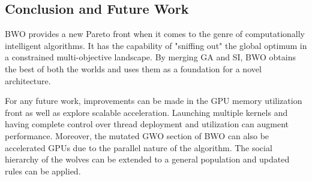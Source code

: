 \documentclass[conference]{IEEEtran}
\theoremstyle{definition}
\begin{document}
\subsection{Conclusion and Future Work}

BWO provides a new Pareto front when it comes to the genre of computationally intelligent algorithms. It has the capability of "sniffing out" the global optimum in a constrained multi-objective landscape. By merging GA and SI, BWO obtains the best of both the worlds and uses them as a foundation for a novel architecture. 

For any future work, improvements can be made in the GPU memory utilization front as well as explore scalable acceleration. Launching multiple kernels and having complete control over thread deployment and utilization can augment performance. Moreover, the mutated GWO section of BWO can also be accelerated GPUs due to the parallel nature of the algorithm. The social hierarchy of the wolves can be extended to a general population and updated rules can be applied. 
\end{document}
